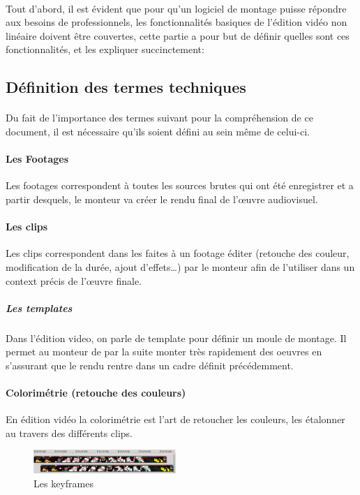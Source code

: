 \paragraph{}
Tout d'abord, il est évident que pour qu'un logiciel de montage puisse répondre
aux besoins de professionnels, les fonctionnalités basiques de l'édition vidéo
non linéaire doivent être couvertes, cette partie a pour but de définir quelles
sont ces fonctionnalités, et les expliquer succinctement:

\subsection{Définition des termes techniques}

\paragraph {}
Du fait de l'importance des termes suivant pour la compréhension de ce document,
il est nécessaire qu'ils soient défini au sein même de celui-ci.

\paragraph{Les Footages}
Les footages correspondent à toutes les sources brutes qui ont été enregistrer
et a partir desquels, le monteur va créer le rendu final de l'œuvre
audiovisuel.

\paragraph{Les clips}
Les clips correspondent dans les faites à un footage éditer (retouche des
couleur, modification de la durée, ajout d'effets\ldots) par le monteur
afin de l'utiliser dans un context précis de l'œuvre finale.

\subparagraph{Les templates}
Dans l'édition video, on parle de template pour définir un moule de montage.
Il permet au monteur de par la suite monter très rapidement des oeuvres en
s'assurant que le rendu rentre dans un cadre définit précédemment.

\paragraph{Colorimétrie (retouche des couleurs)}
En édition vidéo la colorimétrie est l'art de retoucher les couleurs,
les étalonner au travers des différents clips.

\begin{figure}
   \vspace{-20pt}
    \begin{center}
      \includegraphics[width=0.48\textwidth]{images/keyframecurves}
    \end{center}
   \vspace{-30pt}
   \caption{Les keyframes}
   \vspace{-10pt}
   \label{Yes}
\end{figure}
